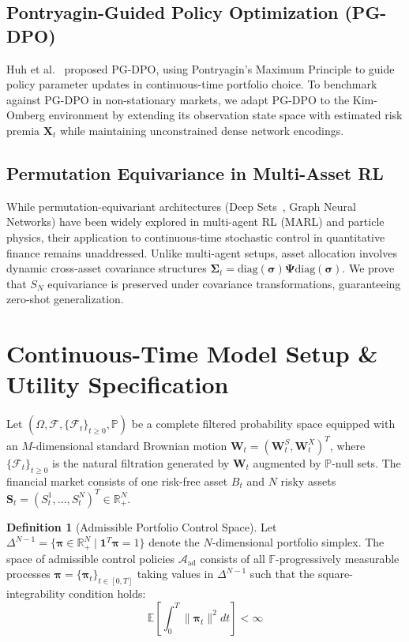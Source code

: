 \documentclass[11pt,a4paper]{article}
\theoremstyle{plain}
\theoremstyle{definition}
\newtheorem{definition}[theorem]{Definition}
\theoremstyle{remark}
\begin{document}
\subsection{Pontryagin-Guided Policy Optimization (PG-DPO)}
Huh et al.~\cite{huh2024pontryagin, huh2025breaking} proposed PG-DPO, using Pontryagin's Maximum Principle to guide policy parameter updates in continuous-time portfolio choice. To benchmark against PG-DPO in non-stationary markets, we adapt PG-DPO to the Kim-Omberg environment by extending its observation state space with estimated risk premia $\mathbf{X}_t$ while maintaining unconstrained dense network encodings.

\subsection{Permutation Equivariance in Multi-Asset RL}
While permutation-equivariant architectures (Deep Sets~\cite{zaheer2017deep}, Graph Neural Networks) have been widely explored in multi-agent RL (MARL) and particle physics, their application to continuous-time stochastic control in quantitative finance remains unaddressed. Unlike multi-agent setups, asset allocation involves dynamic cross-asset covariance structures $\mathbf{\Sigma}_t = \text{diag}(\mathbf{\sigma}) \mathbf{\Psi} \text{diag}(\mathbf{\sigma})$. We prove that $S_N$ equivariance is preserved under covariance transformations, guaranteeing zero-shot generalization.

\section{Continuous-Time Model Setup \& Utility Specification}

Let $(\Omega, \mathcal{F}, \{\mathcal{F}_t\}_{t \ge 0}, \mathbb{P})$ be a complete filtered probability space equipped with an $M$-dimensional standard Brownian motion $\mathbf{W}_t = (\mathbf{W}_t^S, \mathbf{W}_t^X)^T$, where $\{\mathcal{F}_t\}_{t \ge 0}$ is the natural filtration generated by $\mathbf{W}_t$ augmented by $\mathbb{P}$-null sets. The financial market consists of one risk-free asset $B_t$ and $N$ risky assets $\mathbf{S}_t = (S_t^1, \dots, S_t^N)^T \in \mathbb{R}_+^N$.

\begin{definition}[Admissible Portfolio Control Space]
Let $\Delta^{N-1} = \{ \mathbf{\pi} \in \mathbb{R}_+^N \mid \mathbf{1}^T \mathbf{\pi} = 1 \}$ denote the $N$-dimensional portfolio simplex. The space of admissible control policies $\mathcal{A}_{\text{ad}}$ consists of all $\mathbb{F}$-progressively measurable processes $\mathbf{\pi} = \{\mathbf{\pi}_t\}_{t \in [0, T]}$ taking values in $\Delta^{N-1}$ such that the square-integrability condition holds:
\begin{equation}
    \mathbb{E} \left[ \int_0^T \|\mathbf{\pi}_t\|^2 dt \right] < \infty
\end{equation}
\end{definition}
\end{document}

